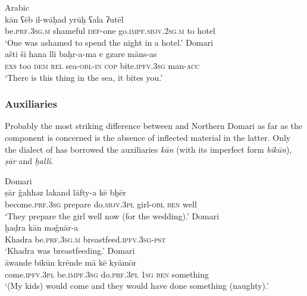 \documentclass[output=paper]{langsci/langscibook}
\begin{document}
\ea
{ Arabic}\\ \label{jordar1}
\gll kān ʕēb il-wāḥad yrūḥ ʕala ʔutēl\\
     be.\textsc{prf.3sg.m} shameful \textsc{def-}one go.\textsc{impf.sbjv.2sg.m} to hotel\\
\glt ‘One was ashamed to spend the night in a hotel.’
\ex \label{asti}
{ Domari}\\
\gll ašti ši hana lli baḥr-a-ma e gzare māns-as\\
     \textsc{exs} too \textsc{dem} \textsc{rel} sea-\textsc{obl-in} \textsc{cop} bite.\textsc{ipfv.3sg} man-\textsc{acc}\\
\glt ‘There is this thing in the sea, it bites you.’
\z


 \subsubsection{Auxiliaries}

Probably the most striking difference between  and Northern Domari as far as the  component is concerned is the absence of  inflected material in the latter. Only the dialect of  has borrowed the auxiliaries \textit{kān} (with its imperfect form \textit{bikūn}), \textit{ṣār} and \textit{ḫalli}.

\ea
{ Domari}\\ \label{sar}
\gll ṣār \v{g}ahhəz lakand lāfty-a kē bḫēr\\
     become.\textsc{prf.3sg} prepare do\textsc{.sbjv.3pl} girl\textsc{{}-obl} \textsc{ben} well\\
\glt ‘They prepare the girl well now (for the wedding).’
\ex \label{xadra}
{ Domari}\\
\gll ḫaḍra kān mə\v{g}nār-a\\
     Khadra be.\textsc{prf.3sg.m} breastfeed.\textsc{ipfv.3sg-pst}\\
\glt ‘Khadra was breastfeeding.’
\ex \label{awande}
{ Domari}\\
\gll āwande bikūn krēnde mā kē kyāmōr\\
     come.\textsc{ipfv.3pl} be.\textsc{impf.3sg} do.\textsc{prf.3pl} \textsc{1sg} \textsc{ben} something\\
\glt ‘(My kids) would come and they would have done something (naughty).’ 
\z
\end{document}
